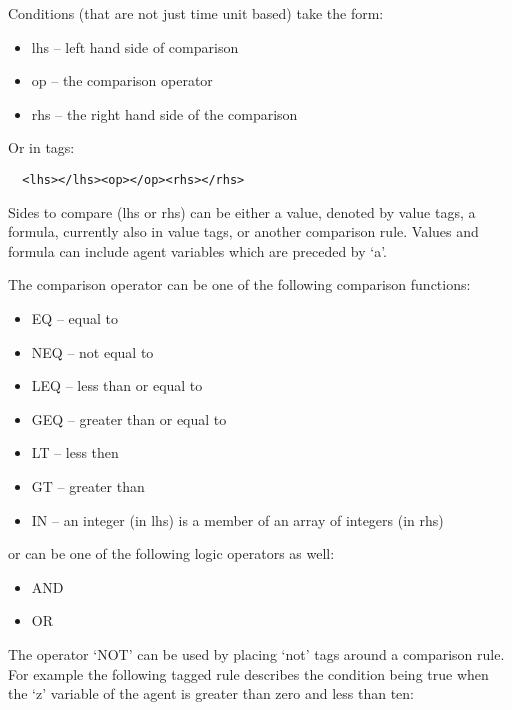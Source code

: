 Conditions (that are not just time unit based) take the form:

\begin{itemize}
  \item lhs -- left hand side of comparison
  \item op -- the comparison operator
  \item rhs -- the right hand side of the comparison
\end{itemize}

Or in tags:

\begin{verbatim}
  <lhs></lhs><op></op><rhs></rhs>
\end{verbatim}

Sides to compare (lhs or rhs) can be either a value, denoted by value tags, 
a formula, currently also in value tags, or another comparison rule.
Values and formula can include agent variables which are preceded by `a'.


The comparison operator can be one of the following comparison functions:

\begin{itemize}
\item EQ -- equal to
\item NEQ -- not equal to
\item LEQ -- less than or equal to
\item GEQ -- greater than or equal to
\item LT -- less then
\item GT -- greater than
\item IN -- an integer (in lhs) is a member of an array of integers (in rhs)
\end{itemize}

or can be one of the following logic operators as well:

\begin{itemize}
\item AND
\item OR
\end{itemize}

The operator `NOT' can be used by placing `not' tags around a comparison rule.
For example the following tagged rule describes the condition being true when
the `z' variable of the agent is greater than zero and less than ten:

